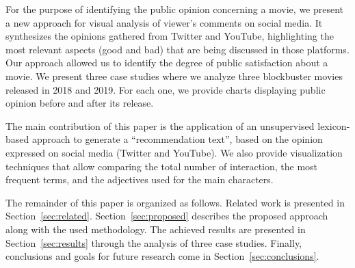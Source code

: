 For the purpose of identifying the public opinion concerning a movie, we present a new approach for visual analysis of viewer's comments on social media. It synthesizes the opinions gathered from Twitter and YouTube, highlighting the most relevant aspects (good and bad) that are being discussed in those platforms. Our approach allowed us to identify the degree of public satisfaction about a movie. We present three case studies where we analyze three blockbuster movies released in 2018 and 2019. For each one, we provide charts displaying public opinion before and after its release.


The main contribution of this paper is the application of an unsupervised lexicon-based approach to generate a  ``recommendation text'', based on the opinion expressed on social media (Twitter and YouTube). We also provide visualization techniques that allow comparing the total number of interaction, the most frequent terms, and the adjectives used for the main characters.

The remainder of this paper is organized as follows. Related work is presented in Section~\ref{sec:related}. Section~\ref{sec:proposed} describes the proposed approach along with the used methodology.
The achieved results are presented in Section~\ref{sec:results} through the analysis of three case studies. Finally, conclusions and goals for future research come in Section~\ref{sec:conclusions}. 
